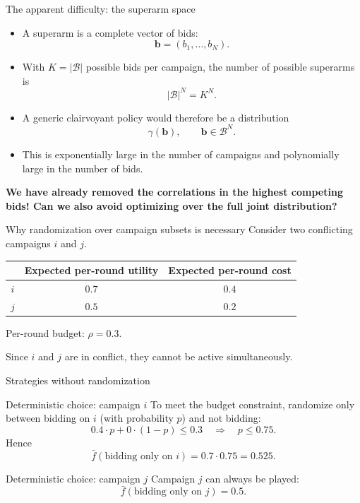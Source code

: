 \begin{frame}{The apparent difficulty: the superarm space}
    \begin{itemize}
        \item A superarm is a complete vector of bids:
        \[\mathbf b=(b_1,\ldots,b_N).\]

        \item With \(K=|\mathcal B|\) possible bids per campaign,
        the number of possible superarms is
        \[|\mathcal B|^N = K^N.\]

        \item A generic clairvoyant policy would therefore be a distribution
        \[\gamma(\mathbf b), \qquad \mathbf b\in\mathcal B^N.\]

        \item This is exponentially large in the number of campaigns and polynomially large in the number of bids.
    \end{itemize}

    \begin{block}{}
        \textbf{We have already removed the correlations in the highest competing bids! Can we also avoid optimizing over the full joint distribution?}
    \end{block}
\end{frame}

\begin{frame}{Why randomization over campaign subsets is necessary}
    Consider two conflicting campaigns \(i\) and \(j\).

    \begin{center}
    \begin{tabular}{c|cc}
        & Expected per-round utility & Expected per-round cost \\ \hline
        \(i\) & \(0.7\) & \(0.4\) \\
        \(j\) & \(0.5\) & \(0.2\)
    \end{tabular}
    \end{center}

    \vspace{0.3cm}

    Per-round budget: $\rho=0.3.$

    Since \(i\) and \(j\) are in conflict, they cannot be active simultaneously.
\end{frame}

\begin{frame}{Strategies without randomization}
    \begin{block}{Deterministic choice: campaign \(i\)}
        To meet the budget constraint, randomize only between bidding on $i$ (with probability $p$) and not bidding:
        \[0.4 \cdot p + 0 \cdot (1 - p) \le 0.3 \quad \Longrightarrow \quad p \le 0.75.\]
        Hence
        \[\bar{f}(\text{bidding only on } i) = 0.7 \cdot 0.75 = \boxed{0.525}.\]
    \end{block}

    \begin{block}{Deterministic choice: campaign \(j\)}
        Campaign \(j\) can always be played:
        \[\bar{f}(\text{bidding only on } j) = \boxed{0.5}.\]
    \end{block}
\end{frame}

